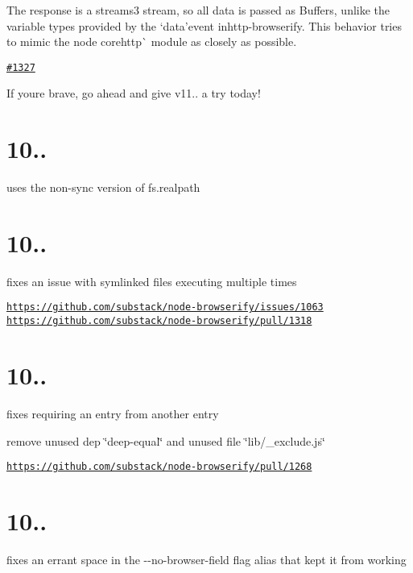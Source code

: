 The {\ttfamily response} is a streams3 stream, so all data is passed as {\ttfamily Buffer}s, unlike the variable types provided by the `\textquotesingle{}data'{\ttfamily event in}http-\/browserify{\ttfamily . This behavior tries to mimic the node core}http\`{} module as closely as possible.


\begin{DoxyItemize}
\item \href{https://github.com/substack/node-browserify/pull/1327}{\tt \#1327}
\end{DoxyItemize}

If you\textquotesingle{}re brave, go ahead and give v11.. a try today!

\section*{10..}

uses the non-\/sync version of fs.\+realpath

\section*{10..}

fixes an issue with symlinked files executing multiple times

\href{https://github.com/substack/node-browserify/issues/1063}{\tt https\+://github.\+com/substack/node-\/browserify/issues/1063} \href{https://github.com/substack/node-browserify/pull/1318}{\tt https\+://github.\+com/substack/node-\/browserify/pull/1318}

\section*{10..}

fixes requiring an entry from another entry

remove unused dep \char`\"{}deep-\/equal\char`\"{} and unused file \char`\"{}lib/\+\_\+exclude.\+js\char`\"{}

\href{https://github.com/substack/node-browserify/pull/1268}{\tt https\+://github.\+com/substack/node-\/browserify/pull/1268}

\section*{10..}

fixes an errant space in the {\ttfamily -\/-\/no-\/browser-\/field} flag alias that kept it from working

